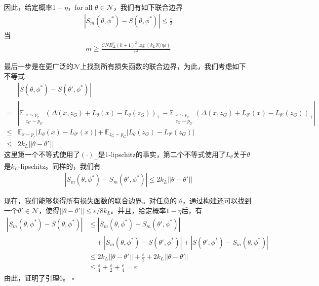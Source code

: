 \begin{Proof}
            \par
            因此，给定概率$1-\eta$，for all $\theta\in \mathcal{N}$，我们有如下联合边界
            \begin{align*}
            |S_m(\theta,\phi^*) - S(\theta,\phi^*)| \leqslant \frac{\varepsilon}{2}
            \end{align*}
            当
            \begin{align*}
            m \geqslant \frac{CNB_\Delta^2(k+1)^2\log (k_LN/\eta\varepsilon)}{\varepsilon^2}
            \end{align*}
            \par
            最后一步是在更广泛的$\mathcal{N}$上找到所有损失函数的联合边界，为此，我们考虑如下不等式
            \begin{align*}
            &|S(\theta,\phi^*)-S(\theta',\phi^*)|\\
            ={}&|\mathbb{E}_{\substack{x\sim p_r\\z_G\sim p_G}}(\Delta(x,z_G)+L_\theta(x)-L_\theta(z_G) )_+ -\mathbb{E}_{\substack{x\sim p_r\\z_G\sim p_G} }(\Delta(x,z_G)+L_{\theta'}(x) - L_{\theta'}(z_G))_+  |\\
            \leqslant{}& \mathbb{E}_{x\sim p_r}|L_\theta(x) - L_{\theta'}(x)|+\mathbb{E}_{z_G\sim p_G}| L_\theta(z_G) - L_{\theta'}(z_G) |\\
            \leqslant {}& 2k_L||\theta - \theta '||
            \end{align*}
            这里第一个不等式使用了$(\cdot)_+$是1-lipschitz的事实，第二个不等式使用了$L_\theta$关于$\theta$是$k_L$-lipschitz。同样的，我们有
            \begin{align*}
            |S_m(\theta,\phi^*) - S_m(\theta',\phi^*)| \leqslant 2 k_L||\theta-\theta'||
            \end{align*}
            \par
            现在，我们能够获得所有损失函数的联合边界。对任意的 $\theta$，通过构建还可以找到一个$\theta'\in \mathcal{N}$，使得$||\theta-\theta'|| \leqslant \varepsilon/8k_L$。并且，给定概率$1-\eta$后，有
            \begin{align*}
            |S_m(\theta,\phi^*) - S(\theta,\phi^*)| &\leqslant |S_m(\theta,\phi^*) - S_m(\theta',\phi^*)|\\
            & \quad + |S_m(\theta,\phi^*) - S(\theta',\phi^*)| +  |S(\theta',\phi^*) - S_m(\theta,\phi^*)| \\
            & \leqslant 2k_L||\theta-\theta'|| + \frac{\varepsilon}{2}+2k_L||\theta-\theta'||\\
            & \leqslant \frac{\varepsilon }{4} +\frac{\varepsilon}{2}+\frac{\varepsilon}{4} = \varepsilon
            \end{align*}
            由此，证明了引理6。
            $\square$
            \end{Proof}
